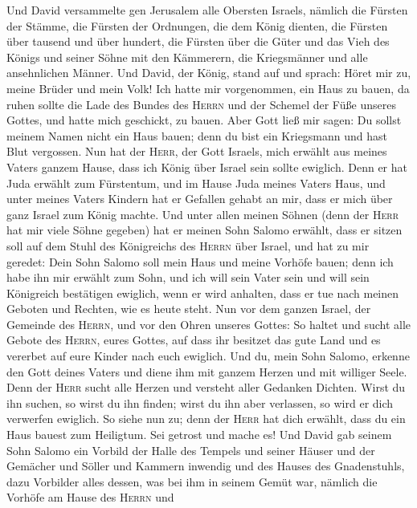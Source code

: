  Und David versammelte gen Jerusalem alle Obersten
Israels, nämlich die Fürsten der Stämme, die Fürsten der Ordnungen, die
dem König dienten, die Fürsten über tausend und über hundert, die
Fürsten über die Güter und das Vieh des Königs und seiner Söhne mit den
Kämmerern, die Kriegsmänner und alle ansehnlichen Männer. 
Und David, der König, stand auf und sprach: Höret mir zu, meine Brüder
und mein Volk! Ich hatte mir vorgenommen, ein Haus zu bauen, da ruhen
sollte die Lade des Bundes des \textsc{Herrn} und der Schemel der Füße
unseres Gottes, und hatte mich geschickt, zu bauen.  Aber
Gott ließ mir sagen: Du sollst meinem Namen nicht ein Haus bauen; denn
du bist ein Kriegsmann und hast Blut vergossen.  Nun hat
der \textsc{Herr}, der Gott Israels, mich erwählt aus meines Vaters
ganzem Hause, dass ich König über Israel sein sollte ewiglich. Denn er
hat Juda erwählt zum Fürstentum, und im Hause Juda meines Vaters Haus,
und unter meines Vaters Kindern hat er Gefallen gehabt an mir, dass er
mich über ganz Israel zum König machte.  Und unter allen
meinen Söhnen (denn der \textsc{Herr} hat mir viele Söhne gegeben) hat
er meinen Sohn Salomo erwählt, dass er sitzen soll auf dem Stuhl des
Königreichs des \textsc{Herrn} über Israel,  und hat zu
mir geredet: Dein Sohn Salomo soll mein Haus und meine Vorhöfe bauen;
denn ich habe ihn mir erwählt zum Sohn, und ich will sein Vater sein
 und will sein Königreich bestätigen ewiglich, wenn er
wird anhalten, dass er tue nach meinen Geboten und Rechten, wie es heute
steht.  Nun vor dem ganzen Israel, der Gemeinde des
\textsc{Herrn}, und vor den Ohren unseres Gottes: So haltet und sucht
alle Gebote des \textsc{Herrn}, eures Gottes, auf dass ihr besitzet das
gute Land und es vererbet auf eure Kinder nach euch ewiglich.
 Und du, mein Sohn Salomo, erkenne den Gott deines Vaters
und diene ihm mit ganzem Herzen und mit williger Seele. Denn der
\textsc{Herr} sucht alle Herzen und versteht aller Gedanken Dichten.
Wirst du ihn suchen, so wirst du ihn finden; wirst du ihn aber
verlassen, so wird er dich verwerfen ewiglich.  So siehe
nun zu; denn der \textsc{Herr} hat dich erwählt, dass du ein Haus bauest
zum Heiligtum. Sei getrost und mache es!  Und David gab
seinem Sohn Salomo ein Vorbild der Halle des Tempels und seiner Häuser
und der Gemächer und Söller und Kammern inwendig und des Hauses des
Gnadenstuhls,  dazu Vorbilder alles dessen, was bei ihm
in seinem Gemüt war, nämlich die Vorhöfe am Hause des \textsc{Herrn} und
